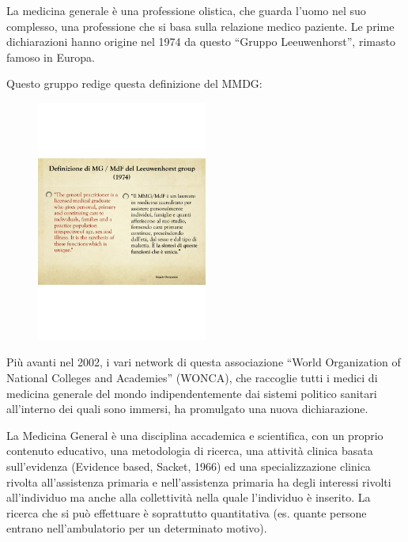 La medicina generale è una professione olistica, che guarda l'uomo nel
suo complesso, una professione che si basa sulla relazione medico
paziente. Le prime dichiarazioni hanno origine nel 1974 da questo
``Gruppo Leeuwenhorst'', rimasto famoso in Europa.

Questo gruppo redige questa definizione del MMDG:

\begin{figure}[!ht]
\centering
	\includegraphics[width=0.5\textwidth]{38/image7.png}
	\end{figure}
	
Più avanti nel 2002, i vari network di questa associazione ``World
Organization of National Colleges and Academies'' (WONCA), che raccoglie
tutti i medici di medicina generale del mondo indipendentemente dai
sistemi politico sanitari all'interno dei quali sono immersi, ha
promulgato una nuova dichiarazione.

La Medicina General è una disciplina accademica e scientifica, con un
proprio contenuto educativo, una metodologia di ricerca, una attività
clinica basata sull'evidenza (Evidence based, Sacket, 1966) ed una
specializzazione clinica rivolta all'assistenza primaria e
nell'assistenza primaria ha degli interessi rivolti all'individuo ma
anche alla collettività nella quale l'individuo è inserito. La ricerca
che si può effettuare è soprattutto quantitativa (es. quante persone
entrano nell'ambulatorio per un determinato motivo).

